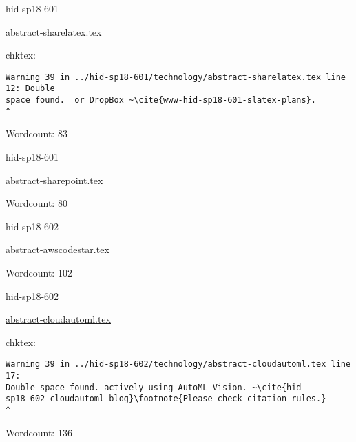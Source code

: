 

\begin{IU}

hid-sp18-601

\href{https://github.com/cloudmesh-community/hid-sp18-601/blob/master//technology/abstract-sharelatex.tex}{abstract-sharelatex.tex}

 
chktex:
\begin{tiny}
\begin{verbatim}
Warning 39 in ../hid-sp18-601/technology/abstract-sharelatex.tex line 12: Double
space found.  or DropBox ~\cite{www-hid-sp18-601-slatex-plans}.             ^
\end{verbatim}
\end{tiny}

Wordcount: 83

\end{IU}



\begin{IU}

hid-sp18-601

\href{https://github.com/cloudmesh-community/hid-sp18-601/blob/master//technology/abstract-sharepoint.tex}{abstract-sharepoint.tex}

 

Wordcount: 80

\end{IU}



\begin{IU}

hid-sp18-602

\href{https://github.com/cloudmesh-community/hid-sp18-602/blob/master//technology/abstract-awscodestar.tex}{abstract-awscodestar.tex}

 

Wordcount: 102

\end{IU}



\begin{IU}

hid-sp18-602

\href{https://github.com/cloudmesh-community/hid-sp18-602/blob/master//technology/abstract-cloudautoml.tex}{abstract-cloudautoml.tex}

 
chktex:
\begin{tiny}
\begin{verbatim}
Warning 39 in ../hid-sp18-602/technology/abstract-cloudautoml.tex line 17:
Double space found. actively using AutoML Vision. ~\cite{hid-
sp18-602-cloudautoml-blog}\footnote{Please check citation rules.}
^
\end{verbatim}
\end{tiny}

Wordcount: 136

\end{IU}

